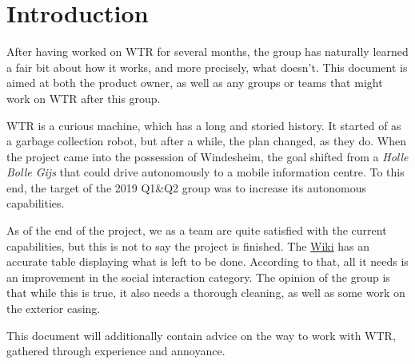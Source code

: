 \section{Introduction}
\label{sec::intro}
After having worked on WTR for several months, the group has naturally learned a fair bit about how it works, and more precisely, what doesn't.
This document is aimed at both the product owner, as well as any groups or teams that might work on WTR after this group.

WTR is a curious machine, which has a long and storied history.
It started of as a garbage collection robot, but after a while, the plan changed, as they do.
When the project came into the possession of Windesheim, the goal shifted from a \textit{Holle Bolle Gijs} that could drive autonomously to a mobile information centre.
To this end, the target of the 2019 Q1\&Q2 group was to increase its autonomous capabilities.

As of the end of the project, we as a team are quite satisfied with the current capabilities, but this is not to say the project is finished.
The \href{https://windesheim-willy.github.io/WillyWiki/}{Wiki} has an accurate table displaying what is left to be done.
According to that, all it needs is an improvement in the social interaction category.
The opinion of the group is that while this is true, it also needs a thorough cleaning, as well as some work on the exterior casing.

This document will additionally contain advice on the way to work with WTR, gathered through experience and annoyance.
\newpage 